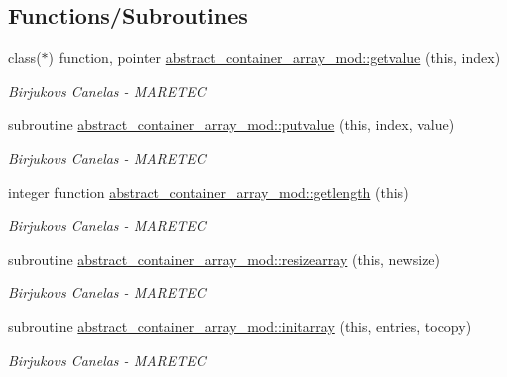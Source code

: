 \subsection*{Functions/\+Subroutines}
\begin{DoxyCompactItemize}
\item 
class($\ast$) function, pointer \hyperlink{namespaceabstract__container__array__mod_a2b3e0aec504d76c73bf7f18158924af4}{abstract\+\_\+container\+\_\+array\+\_\+mod\+::getvalue} (this, index)
\begin{DoxyCompactList}\small\item\em Birjukovs Canelas -\/ M\+A\+R\+E\+T\+EC \end{DoxyCompactList}\item 
subroutine \hyperlink{namespaceabstract__container__array__mod_aae1f6309c51e282a528ce78f128443e0}{abstract\+\_\+container\+\_\+array\+\_\+mod\+::putvalue} (this, index, value)
\begin{DoxyCompactList}\small\item\em Birjukovs Canelas -\/ M\+A\+R\+E\+T\+EC \end{DoxyCompactList}\item 
integer function \hyperlink{namespaceabstract__container__array__mod_a22d71ca3f03bf0bb5d3737338e5e349a}{abstract\+\_\+container\+\_\+array\+\_\+mod\+::getlength} (this)
\begin{DoxyCompactList}\small\item\em Birjukovs Canelas -\/ M\+A\+R\+E\+T\+EC \end{DoxyCompactList}\item 
subroutine \hyperlink{namespaceabstract__container__array__mod_ac2d73eb111ffde938f81e3f93b0cb3e0}{abstract\+\_\+container\+\_\+array\+\_\+mod\+::resizearray} (this, newsize)
\begin{DoxyCompactList}\small\item\em Birjukovs Canelas -\/ M\+A\+R\+E\+T\+EC \end{DoxyCompactList}\item 
subroutine \hyperlink{namespaceabstract__container__array__mod_a6a8e7af177f333262aba941775d6c245}{abstract\+\_\+container\+\_\+array\+\_\+mod\+::initarray} (this, entries, tocopy)
\begin{DoxyCompactList}\small\item\em Birjukovs Canelas -\/ M\+A\+R\+E\+T\+EC \end{DoxyCompactList}\end{DoxyCompactItemize}
